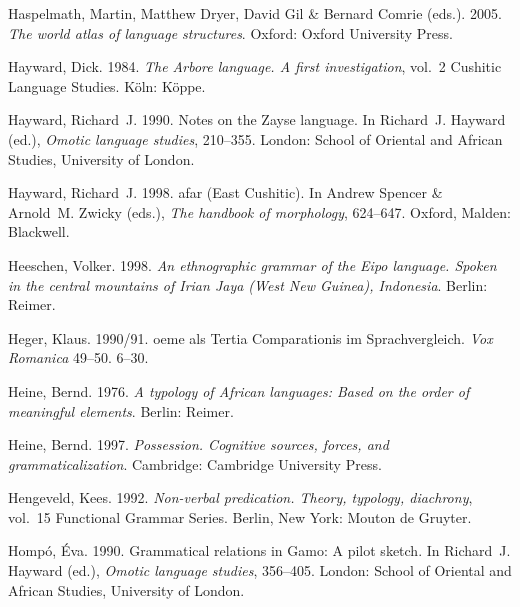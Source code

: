 \documentclass[ number=1
			   ,series=sidl
				,url=http://langsci-press.org/catalog/book/18 
			   ,isbn=978-3-944675-19-0
			   ,output=long   %
			  ]{LSP/langsci}
\begin{document}
\begin{thebibliography}{190}
Haspelmath, Martin, Matthew Dryer, David Gil \& Bernard Comrie (eds.). 2005.
\newblock \emph{The world atlas of language structures}.
\newblock Oxford: Oxford University Press.

Hayward, Dick. 1984.
\newblock \emph{The {A}rbore language. {A} first investigation}, vol.~2
  Cushitic Language Studies.
\newblock K{\"o}ln: K{\"o}ppe.

Hayward, Richard~J. 1990.
\newblock Notes on the {Z}ayse language.
\newblock In Richard~J. Hayward (ed.), \emph{Omotic language studies},
  210--355. London: School of Oriental and African Studies, University of
  London.

Hayward, Richard~J. 1998.
afar ({E}ast {C}ushitic).
\newblock In Andrew Spencer \& Arnold~M. Zwicky (eds.), \emph{The handbook of
  morphology}, 624--647. Oxford, Malden: Blackwell.

Heeschen, Volker. 1998.
\newblock \emph{An ethnographic grammar of the {E}ipo language. {S}poken in the
  central mountains of {I}rian {J}aya ({W}est {N}ew {G}uinea), {I}ndonesia}.
\newblock Berlin: Reimer.

Heger, Klaus. 1990/91.
oeme als {T}ertia {C}omparationis im {S}prachvergleich.
\newblock \emph{Vox Romanica} 49--50. 6--30.

Heine, Bernd. 1976.
\newblock \emph{A typology of {A}frican languages: {B}ased on the order of
  meaningful elements}.
\newblock Berlin: Reimer.

Heine, Bernd. 1997.
\newblock \emph{Possession. {C}ognitive sources, forces, and
  grammaticalization}.
\newblock Cambridge: Cambridge University Press.

Hengeveld, Kees. 1992.
\newblock \emph{Non-verbal predication. {T}heory, typology, diachrony}, vol.~15
  Functional Grammar Series.
\newblock Berlin, New York: Mouton de Gruyter.

Homp{\'o}, {\'E}va. 1990.
\newblock Grammatical relations in {G}amo: {A} pilot sketch.
\newblock In Richard~J. Hayward (ed.), \emph{Omotic language studies},
  356--405. London: School of Oriental and African Studies, University of
  London.


\end{thebibliography}
\end{document}
